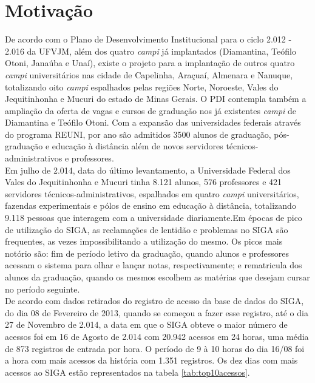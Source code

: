 \section{Motivação}
De acordo com o Plano de Desenvolvimento Institucional para o ciclo 2.012 - 
2.016 da UFVJM, além dos quatro \textit{campi} já implantados (Diamantina, 
Teófilo Otoni, Janaúba e Unaí), existe o projeto para a implantação de outros 
quatro \textit{campi} universitários nas cidade de Capelinha, Araçuaí, Almenara 
e Nanuque, totalizando oito \textit{campi} espalhados pelas regiões Norte, 
Noroeste, Vales do Jequitinhonha e Mucuri do estado de Minas Gerais. O 
PDI contempla também a ampliação da oferta de vagas e cursos de graduação 
nos já existentes \textit{campi} de Diamantina e Teófilo Otoni. Com a expansão 
das universidades federais através do programa REUNI, por ano são admitidos 
3500 alunos de graduação, pós-graduação e educação à distância além de novos 
servidores técnicos-administrativos e professores.\\
Em julho de 2.014, data do último levantamento, a Universidade Federal dos 
Vales do Jequitinhonha e Mucuri tinha 8.121 alunos, 576 professores e 421 
servidores técnicos-administrativos, espalhados em quatro \textit{campi} 
universitários, fazendas experimentais e pólos de ensino em educação à 
distância, totalizando 9.118 pessoas que interagem com a universidade 
diariamente.Em épocas de pico de utilização do SIGA, as reclamações de lentidão 
e problemas no SIGA são frequentes, as vezes impossibilitando a utilização do 
mesmo. Os picos mais notório são: fim de período letivo da graduação, quando 
alunos e professores acessam o sistema para olhar e lançar notas, 
respectivamente; e rematricula dos alunos da graduação, quando os mesmos 
escolhem as matérias que desejam cursar no período seguinte.\\
De acordo com dados retirados do registro de acesso da base de dados 
do SIGA, do dia 08 de Fevereiro de 2013, quando se começou a fazer esse 
registro, até o dia 27 de Novembro de 2.014, a data em que o SIGA obteve o 
maior número de acessos foi em 16 de Agosto de 2.014 com 20.942 acessos em 24 
horas, uma média de 873 registros de entrada por hora. O período de 9 à 10 
horas do dia 16/08 foi a hora com mais acessos da história com 1.351 
registros. Os dez dias com mais acessos ao SIGA estão representados na tabela 
\ref{tab:top10acessos}.
